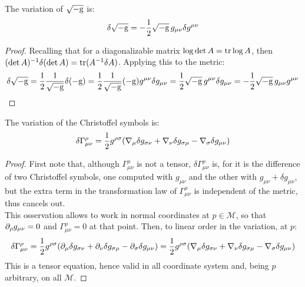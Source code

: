 \begin{lemma}
  The variation of $ \sqrt{-\mathrm{g}} $ is:
  \begin{equation}
    \delta \sqrt{-\mathrm{g}} = - \frac{1}{2} \sqrt{-\mathrm{g}}\, g_{\mu \nu} \delta g^{\mu \nu}
    \label{eq:4.2}
  \end{equation}
\end{lemma}
\begin{proof}
  Recalling that for a diagonalizable matrix $ \log \det A = \operatorname{tr} \log A $, then $ (\det A)^{-1} \delta (\det A) = \operatorname{tr} (A^{-1} \delta A) $. Applying this to the metric:
  \begin{equation*}
    \delta \sqrt{-\mathrm{g}} = \frac{1}{2} \frac{1}{\sqrt{-\mathrm{g}}} \delta (-\mathrm{g}) = \frac{1}{2} \frac{1}{\sqrt{-\mathrm{g}}} (-\mathrm{g}) g^{\mu \nu} \delta g_{\mu \nu} = \frac{1}{2} \sqrt{-\mathrm{g}}\, g^{\mu \nu} \delta g_{\mu \nu} = - \frac{1}{2} \sqrt{-\mathrm{g}}\, g_{\mu \nu} g^{\mu \nu}
  \end{equation*}
\end{proof}

\begin{lemma}
  The variation of the Christoffel symbols is:
  \begin{equation}
    \delta \Gamma^\rho_{\mu \nu} = \frac{1}{2} g^{\rho \sigma} ( \nabla_\mu \delta g_{\sigma \nu} + \nabla_\nu \delta g_{\sigma \mu} - \nabla_\sigma \delta g_{\mu \nu} )
    \label{eq:4.3}
  \end{equation}
\end{lemma}
\begin{proof}
  First note that, although $ \Gamma^\rho_{\mu \nu} $ is not a tensor, $ \delta \Gamma^\rho_{\mu \nu} $ is, for it is the difference of two Christoffel symbols, one computed with $ g_{\mu \nu} $ and the other with $ g_{\mu \nu} + \delta g_{\mu \nu} $, but the extra term in the transformation law of $ \Gamma^\rho_{\mu \nu} $ is independent of the metric, thus cancels out.\\
  This osservation allows to work in normal coordinates at $ p \in \mathcal{M} $, so that $ \partial_\rho g_{\mu \nu} = 0 $ and $ \Gamma^\rho_{\mu \nu} = 0 $ at that point. Then, to linear order in the variation, at $ p $:
  \begin{equation*}
    \delta \Gamma^\rho_{\mu \nu} = \frac{1}{2} g^{\rho \sigma} ( \partial_\mu \delta g_{\sigma \nu} + \partial_\nu \delta g_{\sigma \mu} - \partial_\sigma \delta g_{\mu \nu} ) = \frac{1}{2} g^{\rho \sigma} ( \nabla_\mu \delta g_{\sigma \nu} + \nabla_\nu \delta g_{\sigma \mu} - \nabla_\sigma \delta g_{\mu \nu} )
  \end{equation*}
  This is a tensor equation, hence valid in all coordinate system and, being $ p $ arbitrary, on all $ \mathcal{M} $.
\end{proof}

